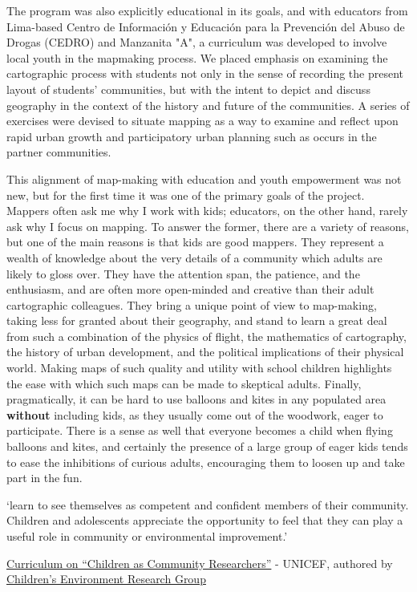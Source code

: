 \documentclass[11pt,oneside,notitlepage]{report}
\begin{document}
The program was also explicitly educational in its goals, and with educators from Lima-based Centro de Información y Educación para la Prevención del Abuso de Drogas (CEDRO) and Manzanita "A", a curriculum was developed to involve local youth in the mapmaking process. We placed emphasis on examining the cartographic process with students not only in the sense of recording the present layout of students' communities, but with the intent to depict and discuss geography in the context of the history and future of the communities. A series of exercises were devised to situate mapping as a way to examine and reflect upon rapid urban growth and participatory urban planning such as occurs in the partner communities.

This alignment of map-making with education and youth empowerment was not new, but for the first time it was one of the primary goals of the project. Mappers often ask me why I work with kids; educators, on the other hand, rarely ask why I focus on mapping. To answer the former, there are a variety of reasons, but one of the main reasons is that kids are good mappers. They represent a wealth of knowledge about the very details of a community which adults are likely to gloss over. They have the attention span, the patience, and the enthusiasm, and are often more open-minded and creative than their adult cartographic colleagues. They bring a unique point of view to map-making, taking less for granted about their geography, and stand to learn a great deal from such a combination of the physics of flight, the mathematics of cartography, the history of urban development, and the political implications of their physical world. Making maps of such quality and utility with school children highlights the ease with which such maps can be made to skeptical adults. Finally, pragmatically, it can be hard to use balloons and kites in any populated area \textbf{without} including kids, as they usually come out of the woodwork, eager to participate. There is a sense as well that everyone becomes a child when flying balloons and kites, and certainly the presence of a large group of eager kids tends to ease the inhibitions of curious adults, encouraging them to loosen up and take part in the fun. 

`learn to see themselves as competent and confident members of their community. Children and adolescents appreciate the opportunity to feel that they can play a useful role in community or environmental improvement.'

\href{http://www.unicef.org/teachers/researchers/intro.htm}{Curriculum on ``{}Children as Community Researchers''{}} - UNICEF, authored by \href{http://web.gc.cuny.edu/che/cerg/about_cerg/environmental_learning_index.htm}{Children'{}s Environment Research Group}
\end{document}
